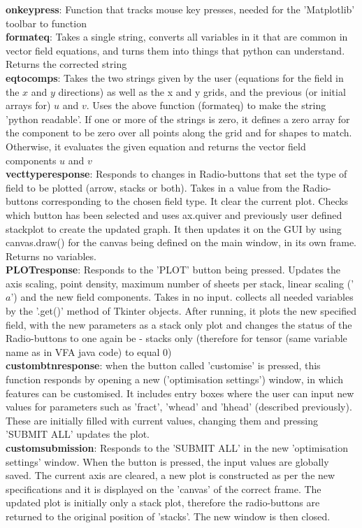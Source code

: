 \documentclass[11]{report}
\begin{document}
\textbf{on\textunderscore key\textunderscore press}: Function that tracks mouse key presses, needed for the 'Matplotlib' toolbar to function\\
\textbf{format\textunderscore eq}: Takes a single string, converts all variables in it that are common in vector field equations, and turns them into things that python can understand. Returns the corrected string\\
\textbf{eq\textunderscore to\textunderscore comps}: Takes the two strings given by the user (equations for the field in the $x$ and $y$ directions) as well as the x and y grids, and the previous (or initial arrays for) $u$ and $v$. Uses the above function (format\textunderscore eq) to make the string 'python readable'. If one or more of the strings is zero, it defines a zero array for the component to be zero over all points along the grid and for shapes to match. Otherwise, it evaluates the given equation and returns the vector field components $u$ and $v$\\
\textbf{vect\textunderscore type\textunderscore response}: Responds to changes in Radio-buttons that set the type of field to be plotted (arrow, stacks or both). Takes in a value from the Radio-buttons corresponding to the chosen field type. It clear the current plot. Checks which button has been selected and uses ax.quiver and previously user defined stack\textunderscore plot to create the updated graph. It then updates it on the GUI by using canvas.draw() for the canvas being defined on the main window, in its own frame. Returns no variables.\\
\textbf{PLOT\textunderscore response}: Responds to the 'PLOT' button being pressed. Updates the axis scaling, point density, maximum number of sheets per stack, linear scaling ('$a$') and the new field components. Takes in no input. collects all needed variables by the '.get()' method of Tkinter objects. After running, it plots the new specified field, with the new parameters as a stack only plot and changes the status of the Radio-buttons to one again be - stacks only (therefore for tensor (same variable name as in VFA java code) to equal 0)\\
\textbf{custom\textunderscore btn\textunderscore response}: when the button called 'customise' is pressed, this function responds by opening a new ('optimisation settings') window, in which features can be customised. It includes entry boxes where the user can input new values for parameters such as 'fract', 'w\textunderscore head' and 'h\textunderscore head' (described previously). These are initially filled with current values, changing them and pressing 'SUBMIT ALL' updates the plot.\\
\textbf{custom\textunderscore submission}: Responds to the 'SUBMIT ALL' in the new 'optimisation settings' window. When the button is pressed, the input values are globally saved. The current axis are cleared, a new plot is constructed as per the new specifications and it is displayed on the 'canvas' of the correct frame. The updated plot is initially only a stack plot, therefore the radio-buttons are returned to the original position of 'stacks'. The new window is then closed.
\end{document}

